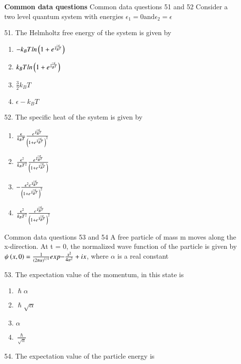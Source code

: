 \documentclass[journal]{IEEEtran}
\begin{document}
\begin{enumerate}
\begin{enumerate}[label=(\Alph*)]
     \end{enumerate}
     \textbf{Common data questions}
     Common data questions 51 and 52
     Consider a two level quantum system with energies $\epsilon_1=0 \text{and} \epsilon_2 = \epsilon$
     \item[51.] The Helmholtz free energy of the system is given by
     \begin{enumerate}[label=(\Alph*)]
        \item $-k_BTln\left(1+e^{\frac{-\epsilon}{k_BT}}\right)$
        \item $k_BTln\left(1+e^{\frac{-\epsilon}{k_BT}}\right)$
        \item $\frac{3}{2}k_B T$
        \item $\epsilon - k_BT$
     \end{enumerate}
     \item [52.]  The specific heat of the system is given by
     \begin{enumerate}[label=(\Alph*)]
        \item $\frac{\epsilon}{k_BT}\frac{e^{\frac{-\epsilon}{k_BT}}}{\left(1+e^{\frac{-\epsilon}{k_BT}}\right)^2}$
        \item $\frac{\epsilon^2}{k_BT^2}\frac{e^{\frac{-\epsilon}{k_BT}}}{\left(1+e^{\frac{-\epsilon}{k_BT}}\right)}$
        \item $-\frac{\epsilon^2e^{\frac{-\epsilon}{k_BT}}}{\left(1+e^{\frac{-\epsilon}{k_BT}}\right)^2}$
        \item  $\frac{\epsilon^2}{k_BT^2}\frac{e^{\frac{-\epsilon}{k_BT}}}{\left(1+e^{\frac{-\epsilon}{k_BT}}\right)^2}$
     \end{enumerate}
     Common data questions 53 and 54
     A free particle of mass m moves along the x-direction. At t = 0, the normalized wave function of the particle is given by $\psi\left(x,0\right)=\frac{1}{\left(2\pi\alpha\right)^{1/4}}exp{-\frac{x^2}{4\alpha^2}+ix}$, where $\alpha$ is a real constant 
     \item[53.] The expectation value of the momentum, in this state is 
     \begin{enumerate}[label=(\Alph*)]
        \item $\hslash \alpha$
        \item $\hslash \sqrt{\alpha}$
        \item $\alpha$
        \item $\frac{\hslash}{\sqrt{\alpha}}$
     \end{enumerate}
     \item[54.] The expectation value of the particle energy is 

\end{enumerate}
\end{document}

